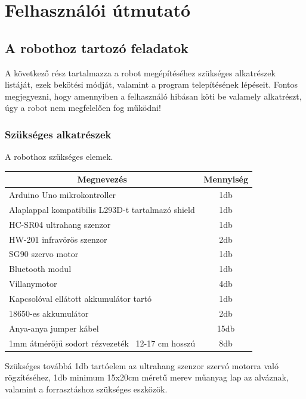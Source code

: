 \documentclass[]{thesis-ekf}
\theoremstyle{definition}
\begin{document}
\chapter{Felhasználói útmutató}\label{felhaszn-útmutató}
\section{A robothoz tartozó feladatok}
A következő rész tartalmazza a robot megépítéséhez szükséges alkatrészek listáját, ezek bekötési módját, valamint a program telepítésének lépéseit. Fontos megjegyezni, hogy amennyiben a felhasználó hibásan köti be valamely alkatrészt, úgy a robot nem megfelelően fog működni!

\subsection{Szükséges alkatrészek}
A robothoz szükséges elemek.

\begin{center}
	\begin{tabular}{|l|c|}
	\hline
	\multicolumn{1}{|c|}{\textbf{Megnevezés}}&\textbf{Mennyiség}\\
	\hline
	Arduino Uno mikrokontroller&1db\\
	\hline
	Alaplappal kompatibilis L293D-t tartalmazó shield&1db\\
	\hline
	HC-SR04 ultrahang szenzor&1db\\
	\hline
	HW-201 infravörös szenzor&2db\\
	\hline
	SG90 szervo motor&1db\\
	\hline
	Bluetooth modul&1db\\
	\hline
	Villanymotor&4db\\
	\hline
	Kapcsolóval ellátott akkumulátor tartó&1db\\
	\hline
	18650-es akkumulátor&2db\\
	\hline
	Anya-anya jumper kábel&15db\\
	\hline
	1mm átmérőjű sodort rézvezeték ~12-17 cm hosszú&8db\\
	\hline
\end{tabular}
\end{center}
Szükséges továbbá 1db tartóelem az ultrahang szenzor szervó motorra való rögzítéséhez, 1db minimum 15x20cm méretű merev műanyag lap az alváznak, valamint a forrasztáshoz szükséges eszközök.
\end{document}
